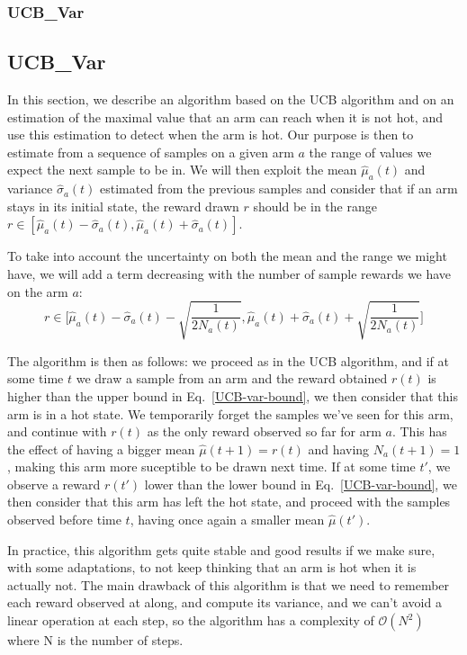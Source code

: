 \documentclass[french]{beamer}
\begin{document}
\begin{frame}
	\frametitle{UCB\_Var}
	
	\subsection{UCB\_Var}
	
	In this section, we describe an algorithm based on the UCB algorithm and on an estimation of the maximal
	value that an arm can reach when it is not hot, and use this estimation to detect when the
	arm is hot. Our purpose is then to estimate from a sequence of samples on a given arm $a$ the range
	of values we expect the next sample to be in. We will then exploit the mean $\hat\mu_a(t)$ and variance $\hat\sigma_a(t)$
	estimated from the previous samples and consider that if an arm stays in its initial
	state, the reward drawn $r$ should be in the range $r \in [\hat\mu_a(t)-\hat\sigma_a(t), \hat\mu_a(t)+\hat\sigma_a(t)]$.
	
	To take into account the uncertainty on both the mean and the range we might have,
	we will add a term decreasing with the number of sample rewards we have on the arm $a$:
	\begin{equation}\label{UCB-var-bound}
	r \in \Big[\hat\mu_a(t)-\hat\sigma_a(t)-\sqrt{\frac{1}{2N_a(t)}}, \hat\mu_a(t)+\hat\sigma_a(t)+\sqrt{\frac{1}{2N_a(t)}}\Big]
	\end{equation}
	
	The algorithm is then as follows: we proceed as in the UCB algorithm, and if at
	some time $t$ we draw a sample from an arm and the reward obtained $r(t)$ is higher than the upper bound
	in Eq.~\ref{UCB-var-bound}, we then consider that this arm is in a hot state.
	We temporarily forget the samples we've seen for this arm, and continue
	with $r(t)$ as the only reward observed so far for arm $a$. This has the effect
	of having a bigger mean $\hat\mu(t+1) = r(t)$ and having $N_a(t+1) = 1$, making this arm more suceptible
	to be drawn next time. If at some time $t'$, we observe a reward $r(t')$ lower
	than the lower bound in Eq.~\ref{UCB-var-bound}, we then consider that this arm has
	left the hot state, and proceed with the samples observed before time $t$, having
	once again a smaller mean $\hat\mu(t')$.
	
	In practice, this algorithm gets quite stable and good results if we make sure,
	with some adaptations, to not keep thinking that an arm is hot when it is actually
	not. The main drawback of this algorithm is that we need to remember each
	reward observed at along, and compute its variance, and we can't avoid
	a linear operation at each step, so the algorithm has a complexity of $\mathcal{O}(N^2)$ where N
	is the number of steps.
\end{frame}
\end{document}
